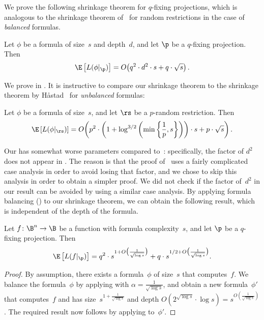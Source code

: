 \documentclass{toc}
\begin{document}
\noindent We prove the following shrinkage theorem for $q$-fixing
projections, which is analogous to the shrinkage theorem of~\cite{H98}
for random restrictions in the case of \emph{balanced} formulas. 
\begin{theorem}
\label{thm:shrinkage-fixing}Let $\phi$ be a formula of size~$s$ and
depth~$d$, and let $\p$ be a $q$-fixing projection. Then 
\[
\E\left[L(\phi|_{\p})\right]=O\!\left(q^{2}\cdot d^{2}\cdot s+q\cdot\sqrt{s}\right).
\]
\end{theorem}

\noindent We prove  in .
It is instructive to compare our shrinkage theorem to the shrinkage
theorem by H{\aa}stad~\cite{H98} for \emph{unbalanced} formulas:
\begin{theorem}[\cite{H98}]
\label{thm:shrinkage-hastad}Let $\phi$ be a formula of size~$s$,
and let $\rs$ be a $p$-random restriction. Then
\[
\E\left[L(\phi|_{\rs})\right]=O\!\left(p^{2}\cdot\left(1+\log^{3/2}\left(\min\left\{ \frac{1}{p},s\right\} \right)\right)\cdot s+p\cdot\sqrt{s}\right).
\]
\end{theorem}

Our  has somewhat worse parameters compared
to~: specifically, the factor of $d^{2}$
does not appear in . The reason is that the
proof of~\cite{H98} uses a fairly complicated case analysis in order
to avoid losing that factor, and we chose to skip this analysis in
order to obtain a simpler proof. We did not check if the factor of~$d^{2}$
in our result can be avoided by using a similar case analysis. By
applying formula balancing () to our shrinkage
theorem, we can obtain the following result, which is independent
of the depth of the formula. 
\begin{corollary}
\label{cor:shrinkage-without-depth-fixing}Let $f\colon\B^{n}\to\B$ be
a function with formula complexity~$s$, and let $\p$ be a $q$-fixing
projection. Then 
\[
\E\left[L(f|_{\p})\right]=q^{2}\cdot s^{1+O\bigl(\frac{1}{\sqrt{\log s}}\bigr)}+q\cdot s^{1/2+O\bigl(\frac{1}{\sqrt{\log s}}\bigr)}.
\]
\end{corollary}

\begin{proof}
By assumption, there exists a formula~$\phi$ of size~$s$ that
computes~$f$. We balance the formula~$\phi$ by applying 
with $\alpha=\frac{1}{\sqrt{\log s}}$, and obtain a new formula~$\phi'$
that computes~$f$ and has size~$s^{1+\frac{1}{\sqrt{\log s}}}$
and depth $O(2^{\sqrt{\log s}}\cdot\log s)=s^{O(\frac{1}{\sqrt{\log s}})}$.
The required result now follows by applying 
to~$\phi'$.
\end{proof}
\end{document}
